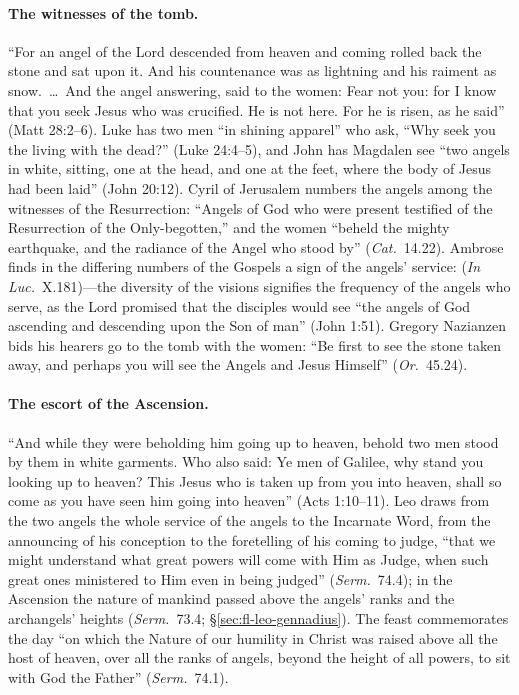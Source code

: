 \paragraph{The witnesses of the tomb.} ``For an angel of the Lord descended
from heaven and coming rolled back the stone and sat upon it. And his
countenance was as lightning and his raiment as snow.~\dots\ And the angel
answering, said to the women: Fear not you: for I know that you seek Jesus
who was crucified. He is not here. For he is risen, as he said'' (Matt
28:2--6). Luke has two men ``in shining apparel'' who ask, ``Why seek you
the living with the dead?'' (Luke 24:4--5), and John has Magdalen see ``two
angels in white, sitting, one at the head, and one at the feet, where the
body of Jesus had been laid'' (John 20:12). Cyril of Jerusalem numbers the
angels among the witnesses of the Resurrection: ``Angels of God who were
present testified of the Resurrection of the Only-begotten,'' and the women
``beheld the mighty earthquake, and the radiance of the Angel who stood
by'' (\emph{Cat.}\ 14.22). Ambrose finds in the differing numbers of the
Gospels a sign of the angels' service:  (\emph{In Luc.}\
X.181)---the diversity of the visions signifies the frequency of the angels
who serve, as the Lord promised that the disciples would see ``the angels of
God ascending and descending upon the Son of man'' (John 1:51). Gregory
Nazianzen bids his hearers go to the tomb with the women: ``Be first to see
the stone taken away, and perhaps you will see the Angels and Jesus
Himself'' (\emph{Or.}\ 45.24).

\paragraph{The escort of the Ascension.} ``And while they were beholding
him going up to heaven, behold two men stood by them in white garments. Who
also said: Ye men of Galilee, why stand you looking up to heaven? This Jesus
who is taken up from you into heaven, shall so come as you have seen him
going into heaven'' (Acts 1:10--11). Leo draws from the two angels the
whole service of the angels to the Incarnate Word, from the announcing of
his conception to the foretelling of his coming to judge, ``that we might
understand what great powers will come with Him as Judge, when such great
ones ministered to Him even in being judged'' (\emph{Serm.}\ 74.4); in the
Ascension the nature of mankind passed above the angels' ranks and the
archangels' heights (\emph{Serm.}\ 73.4;
\S\ref{sec:fl-leo-gennadius}). The feast commemorates the day ``on which the Nature of our humility in
Christ was raised above all the host of heaven, over all the ranks of
angels, beyond the height of all powers, to sit with God the Father''
(\emph{Serm.}\ 74.1).

